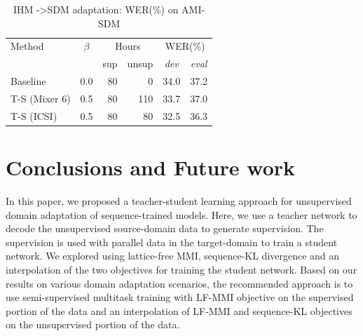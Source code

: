 \documentclass{article}
\begin{document}
\begin{table}[t]
  \centering
  \caption{\label{tab:sdm_results}IHM -\textgreater SDM adaptation: WER(\%) on
  AMI-SDM}
  \begin{tabular}{lc|rr|cc}
    Method & $\beta$ & \multicolumn{2}{c|}{Hours} & \multicolumn{2}{c}{WER(\%)} \\
    & & sup & unsup & {\em dev} & {\em eval}  \\
    \hline \hline
  Baseline & 0.0 & 80 & 0 & 34.0 & 37.2 \\
    \hline
    T-S (Mixer 6) & 0.5 & 80 & 110 & 33.7 & 37.0 \\
    T-S (ICSI) & 0.5 & 80 & 80 & 32.5 & 36.3 \\
    \hline
  \end{tabular}
\end{table}


%

\section{Conclusions and Future work}
\label{sec:conclusions}
In this paper, we proposed a teacher-student learning approach for 
unsupervised domain adaptation of sequence-trained models. 
Here, we use a teacher network to decode the
unsupervised source-domain data to generate supervision. The supervision is used with
parallel data in the target-domain to train a student network.
We explored using lattice-free
MMI, sequence-KL divergence and an interpolation of the two objectives for training the student network. 
Based on our results on various domain adaptation scenarios, 
the recommended approach is to use semi-supervised multitask training with LF-MMI objective 
on the supervised portion of the data and 
an interpolation of LF-MMI and sequence-KL objectives on the unsupervised portion of the data. 
\end{document}
